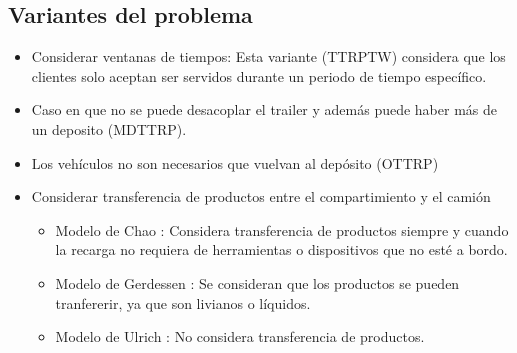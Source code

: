 \documentclass[letter, 10pt]{article}
\begin{document}
\subsection{Variantes del problema}
\begin{itemize}
    \item Considerar ventanas de tiempos: Esta variante (TTRPTW) considera que los clientes solo aceptan ser servidos durante un periodo de tiempo específico.
    \item Caso en que no se puede desacoplar el trailer y además puede haber más de un deposito (MDTTRP).
    \item Los vehículos no son necesarios que vuelvan al depósito (OTTRP)
    \item Considerar transferencia de productos entre el compartimiento y el camión
    \begin{itemize}
        \item Modelo de Chao \cite{Chao}: Considera transferencia de productos siempre y cuando la recarga no requiera de herramientas o dispositivos que no esté a bordo.
        \item Modelo de Gerdessen \cite{Gerdessen}: Se consideran que los productos se pueden tranfererir, ya que son livianos o líquidos.
        \item Modelo de Ulrich \cite{Ulrich}: No considera transferencia de productos.
    \end{itemize}
    
\end{itemize}
\end{document}
